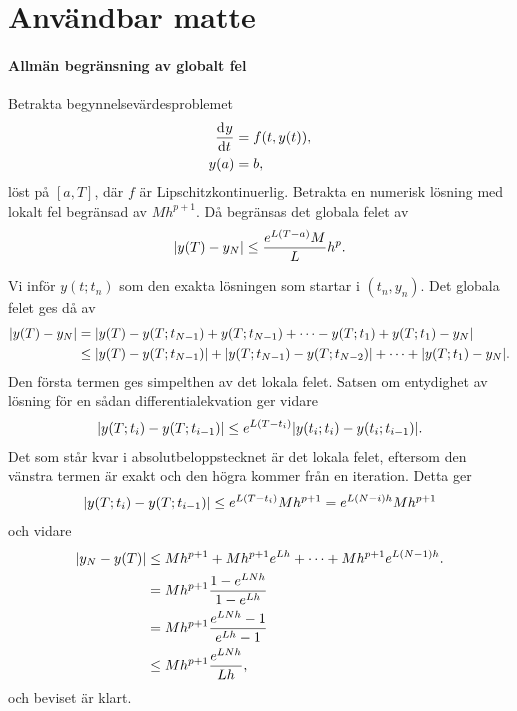 \section{Användbar matte}

\paragraph{Allmän begränsning av globalt fel}
Betrakta begynnelsevärdesproblemet
\begin{align*}
	\dv[]{y}{t} (t) &= f(t, y(t)), \\
	y(a)            &= b,
\end{align*}
löst på $[a, T]$, där $f$ är Lipschitzkontinuerlig. Betrakta en numerisk lösning med lokalt fel begränsad av $Mh^{p + 1}$. Då begränsas det globala felet av
\begin{align*}
	\abs{y(T) - y_{N}} \leq \frac{e^{L(T - a)}M}{L}h^{p}.
\end{align*}

\proof
Vi inför $y(t; t_{n})$ som den exakta lösningen som startar i $(t_{n}, y_{n})$. Det globala felet ges då av
\begin{align*}
	\abs{y(T) - y_{N}} &= \abs{y(T) - y(T; t_{N - 1}) + y(T; t_{N - 1}) + \dots - y(T; t_{1}) + y(T; t_{1}) - y_{N}} \\
	                   &\leq \abs{y(T) - y(T; t_{N - 1})} + \abs{y(T; t_{N - 1}) - y(T; t_{N - 2})} + \dots + \abs{y(T; t_{1}) - y_{N}}.
\end{align*}
Den första termen ges simpelthen av det lokala felet. Satsen om entydighet av lösning för en sådan differentialekvation ger vidare
\begin{align*}
	\abs{y(T; t_{i}) - y(T; t_{i - 1})} \leq e^{L(T - t_{i})}\abs{y(t_{i}; t_{i}) - y(t_{i}; t_{i - 1})}.
\end{align*}
Det som står kvar i absolutbeloppstecknet är det lokala felet, eftersom den vänstra termen är exakt och den högra kommer från en iteration. Detta ger
\begin{align*}
	\abs{y(T; t_{i}) - y(T; t_{i - 1})} \leq e^{L(T - t_{i})}Mh^{p + 1} = e^{L(N - i)h}Mh^{p + 1}
\end{align*}
och vidare
\begin{align*}
	\abs{y_{N} - y(T)} &\leq Mh^{p + 1} + Mh^{p + 1}e^{Lh} + \dots + Mh^{p + 1}e^{L(N - 1)h}. \\
	                   &= Mh^{p + 1}\frac{1 - e^{LNh}}{1 - e^{Lh}} \\
	                   &= Mh^{p + 1}\frac{e^{LNh} - 1}{e^{Lh} - 1} \\
	                   &\leq Mh^{p + 1}\frac{e^{LNh}}{Lh},
\end{align*}
och beviset är klart.

